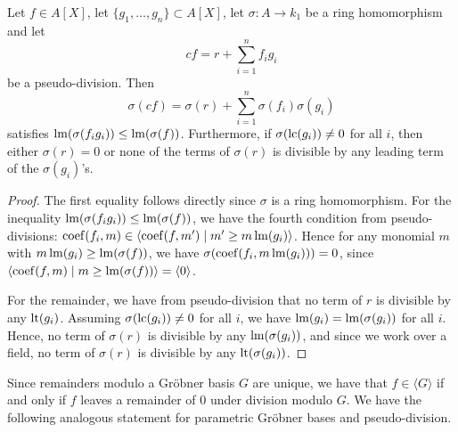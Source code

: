 \begin{lemma}\label{lem:ps_div_to_div}
  Let $f \in A[X]$, let $\{g_{1}, \dots, g_{n}\} \subset A[X]$, let $\sigma : A \to k_{1}$ be a ring homomorphism and let
  \[cf = r + \sum_{i=1}^{n}f_{i}g_{i}\]
  be a pseudo-division. Then
  \[\sigma(cf) = \sigma(r) + \sum_{i=1}^{n} \sigma(f_{i})\sigma(g_{i})\]
  satisfies $\operatorname{lm}(\sigma(f_{i} g_{i})) \leq \operatorname{lm}(\sigma(f))$. Furthermore, if $\sigma(\operatorname{lc}(g_{i})) \neq 0$ for all $i$, then either $\sigma(r) = 0$ or none of the terms of $\sigma(r)$ is divisible by any leading term of the $\sigma(g_{i})$'s.
\end{lemma}
\begin{proof}
  The first equality follows directly since $\sigma$ is a ring homomorphism. For the inequality $\operatorname{lm}(\sigma(f_{i} g_{i})) \leq \operatorname{lm}(\sigma(f))$, we have the fourth condition from pseudo-divisions: $\operatorname{coef}(f_{i}, m) \in \langle \operatorname{coef}(f, m') \mid m' \geq m \operatorname{lm}(g_{i}) \rangle$. Hence for any monomial $m$ with $m\operatorname{lm}(g_{i}) \geq \operatorname{lm}(\sigma(f))$, we have $\sigma(\operatorname{coef}(f_{i}, m \operatorname{lm}(g_{i}))) = 0$, since $\langle \operatorname{coef}(f, m) \mid m \geq \operatorname{lm}(\sigma(f)) \rangle = \langle 0 \rangle$.

  For the remainder, we have from pseudo-division that no term of $r$ is divisible by any $\operatorname{lt}(g_{i})$. Assuming $\sigma(\operatorname{lc}(g_{i})) \neq 0$ for all $i$, we have $\operatorname{lm}(g_{i}) = \operatorname{lm}(\sigma(g_{i}))$ for all $i$. Hence, no term of $\sigma(r)$ is divisible by any $\operatorname{lm}(\sigma(g_{i}))$, and since we work over a field, no term of $\sigma(r)$ is divisible by any $\operatorname{lt}(\sigma(g_{i}))$.
\end{proof}


Since remainders modulo a Gröbner basis $G$ are unique, we have that $f \in \langle G \rangle$ if and only if $f$ leaves a remainder of $0$ under division modulo $G$. We have the following analogous statement for parametric Gröbner bases and pseudo-division.

